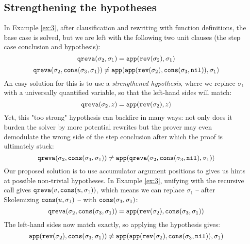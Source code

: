 \subsection{Strengthening the hypotheses}
In Example \ref{ex:3}, after clausification and rewriting with function definitions, the base case is solved, but we are left with the following two unit clauses (the step case conclusion and hypothesis):
$$\mathtt{qreva}(\sigma_2,\sigma_1)=\mathtt{app}(\mathtt{rev}(\sigma_2),\sigma_1)$$
$$\mathtt{qreva}(\sigma_2,\mathtt{cons}(\sigma_3,\sigma_1))\neq\mathtt{app}(\mathtt{app}(\mathtt{rev}(\sigma_2),\mathtt{cons}(\sigma_3,\mathtt{nil})),\sigma_1)$$
An easy solution for this is to use a \textit{strengthened hypothesis}, where we replace $\sigma_1$ with a universally quantified variable, so that the left-hand sides will match:
$$\mathtt{qreva}(\sigma_2,z)=\mathtt{app}(\mathtt{rev}(\sigma_2),z)$$
Yet, this "too strong" hypothesis can backfire in many ways: not only does it burden the solver by more potential rewrites but the prover may even demodulate the wrong side of the step conclusion after which the proof is ultimately stuck:
$$\mathtt{qreva}(\sigma_2,\mathtt{cons}(\sigma_3,\sigma_1))\neq\mathtt{app}(\mathtt{qreva}(\sigma_2,\mathtt{cons}(\sigma_3,\mathtt{nil}),\sigma_1))$$
Our proposed solution is to use accumulator argument positions to gives us hints at possible non-trivial hypotheses. In Example \ref{ex:3}, unifying with the recursive call gives $\mathtt{qreva}(v, \mathtt{cons}(u,\sigma_1))$, which means we can replace $\sigma_1$ -- after Skolemizing $\mathtt{cons}(u,\sigma_1)$ -- with $\mathtt{cons}(\sigma_3,\sigma_1)$:
$$\mathtt{qreva}(\sigma_2,\mathtt{cons}(\sigma_3,\sigma_1))=\mathtt{app}(\mathtt{rev}(\sigma_2),\mathtt{cons}(\sigma_3,\sigma_1))$$
The left-hand sides now match exactly, so applying the hypothesis gives:
$$\mathtt{app}(\mathtt{rev}(\sigma_2),\mathtt{cons}(\sigma_3,\sigma_1))\neq\mathtt{app}(\mathtt{app}(\mathtt{rev}(\sigma_2),\mathtt{cons}(\sigma_3,\mathtt{nil})),\sigma_1)$$